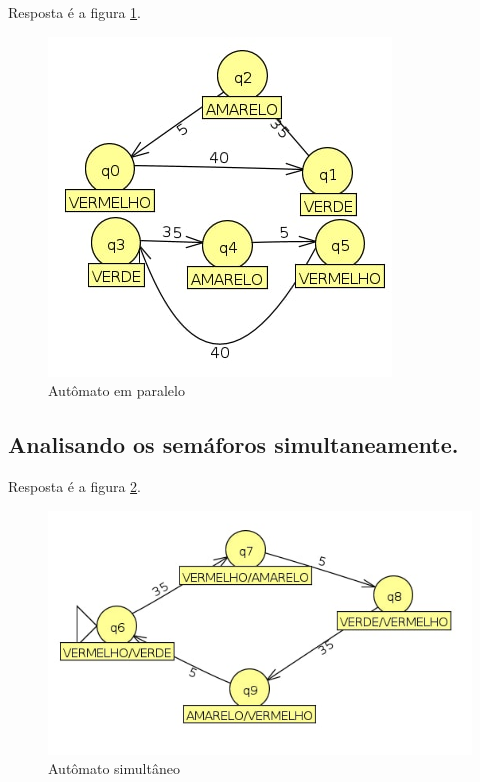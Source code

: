 \documentclass[11pt]{article}
\begin{document}
Resposta é a figura \ref{fig:orgac52818}.
\begin{figure}[htbp]
\centering
\includegraphics[width=.9\linewidth]{./q7/paralelo.jpg}
\caption{\label{fig:orgac52818}
Autômato em paralelo}
\end{figure}

\subsection{Analisando os semáforos simultaneamente.}
\label{sec:org95ad0ae}

Resposta é a figura \ref{fig:org75ec515}.
\begin{figure}[htbp]
\centering
\includegraphics[width=.9\linewidth]{./q7/simultaneo.jpg}
\caption{\label{fig:org75ec515}
Autômato simultâneo}
\end{figure}
\end{document}
